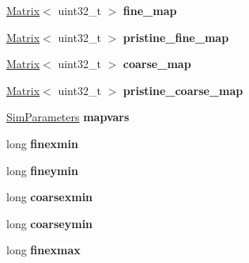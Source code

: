 \begin{DoxyCompactItemize}
\item 
\hyperlink{class_matrix}{Matrix}$<$ uint32\+\_\+t $>$ {\bfseries fine\+\_\+map}\hypertarget{class_map_a4579c0a75f27777739b8f13ec620fa21}{}\label{class_map_a4579c0a75f27777739b8f13ec620fa21}

\item 
\hyperlink{class_matrix}{Matrix}$<$ uint32\+\_\+t $>$ {\bfseries pristine\+\_\+fine\+\_\+map}\hypertarget{class_map_a807b35e2a3822cb98f92cf545cb85cf6}{}\label{class_map_a807b35e2a3822cb98f92cf545cb85cf6}

\item 
\hyperlink{class_matrix}{Matrix}$<$ uint32\+\_\+t $>$ {\bfseries coarse\+\_\+map}\hypertarget{class_map_a67045641f66beb1d3689726cb23fbc29}{}\label{class_map_a67045641f66beb1d3689726cb23fbc29}

\item 
\hyperlink{class_matrix}{Matrix}$<$ uint32\+\_\+t $>$ {\bfseries pristine\+\_\+coarse\+\_\+map}\hypertarget{class_map_a6d2258eb1652f5d411d88a02efaf4862}{}\label{class_map_a6d2258eb1652f5d411d88a02efaf4862}

\item 
\hyperlink{struct_sim_parameters}{Sim\+Parameters} {\bfseries mapvars}\hypertarget{class_map_afc7243e4b89be2a6e7340e8fa84c6679}{}\label{class_map_afc7243e4b89be2a6e7340e8fa84c6679}

\item 
long {\bfseries finexmin}\hypertarget{class_map_a1f1b99453482eac3e459e4346eeb3c7e}{}\label{class_map_a1f1b99453482eac3e459e4346eeb3c7e}

\item 
long {\bfseries fineymin}\hypertarget{class_map_aa654a9603699c76654c528f8462cf246}{}\label{class_map_aa654a9603699c76654c528f8462cf246}

\item 
long {\bfseries coarsexmin}\hypertarget{class_map_a52e2a83e9f8cedcd1bb41bd41f7f54fb}{}\label{class_map_a52e2a83e9f8cedcd1bb41bd41f7f54fb}

\item 
long {\bfseries coarseymin}\hypertarget{class_map_a02ab899e67c2b145294fe1f527fa3024}{}\label{class_map_a02ab899e67c2b145294fe1f527fa3024}

\item 
long {\bfseries finexmax}\hypertarget{class_map_a94bb813e300ee493f057afb154a35f88}{}\label{class_map_a94bb813e300ee493f057afb154a35f88}


\end{DoxyCompactItemize}
